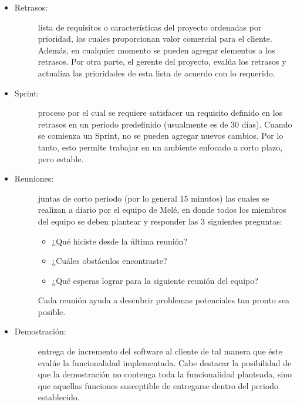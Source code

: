 \begin{itemize}
	\item 	\begin{description}
				\item[Retrasos:] lista de requisitos o características del proyecto ordenadas por prioridad, los cuales proporcionan valor comercial para el cliente. Además, en cualquier momento se pueden agregar elementos a los retrasos. Por otra parte, el gerente del proyecto, evalúa los retrasos y actualiza las prioridades de esta lista de acuerdo con lo requerido. 
			\end{description}

	\item 	\begin{description}
				\item[Sprint:] proceso por el cual se requiere satisfacer un requisito definido en los retrasos en un periodo predefinido (usualmente es de 30 días). Cuando se comienza un Sprint, no se pueden agregar nuevos cambios. Por lo tanto, esto permite trabajar en un ambiente enfocado a corto plazo, pero estable.
			\end{description}

	\item 	\begin{description}
			    \item[Reuniones:] juntas de corto periodo (por lo general 15 minutos) las cuales se realizan a diario por el equipo de Melé, en donde todos los miembros del equipo se deben plantear y responder las 3 siguientes preguntas: 
% 
			    \begin{itemize}
			    	\item ¿Qué hiciste desde la última reunión?

			    	\item ¿Cuáles obstáculos encontraste? 

			    	\item ¿Qué esperas lograr para la siguiente reunión del equipo?
			    \end{itemize}

			 	Cada reunión ayuda a descubrir problemas potenciales tan pronto sea posible.
			\end{description}

	\item 	\begin{description}
				\item[Demostración:] entrega de incremento del software al cliente de tal manera que éste evalúe la funcionalidad implementada. Cabe destacar la posibilidad de que la demostración no contenga toda la funcionalidad planteada, sino que aquellas funciones susceptible de entregarse dentro del periodo establecido.
			\end{description}
\end{itemize}

